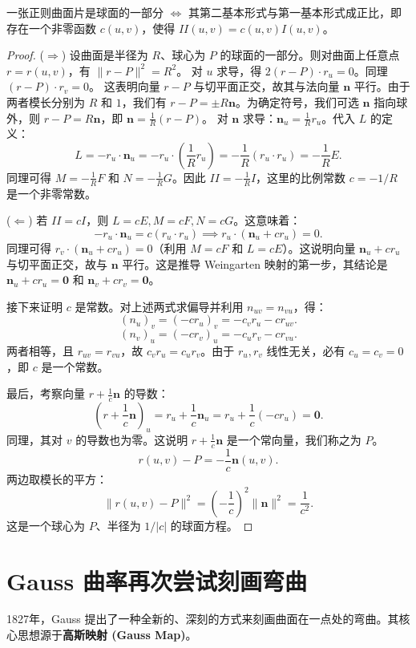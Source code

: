 \documentclass[lang=cn,10pt,thmcnt=section]{elegantbook}
\renewcommand{\vec}[1]{\mathbf{#1}}
\begin{document}
\begin{proposition}
    一张正则曲面片是球面的一部分 $\iff$ 其第二基本形式与第一基本形式成正比，即存在一个非零函数 $c(u,v)$，使得 $II(u,v) = c(u,v) I(u,v)$。
\end{proposition}
\begin{proof}
    ($\Rightarrow$) 设曲面是半径为 $R$、球心为 $P$ 的球面的一部分。则对曲面上任意点 $r=r(u,v)$，有 $\|r-P\|^2 = R^2$。
    对 $u$ 求导，得 $2(r-P) \cdot r_u = 0$。同理 $(r-P)\cdot r_v=0$。
    这表明向量 $r-P$ 与切平面正交，故其与法向量 $\vec{n}$ 平行。由于两者模长分别为 $R$ 和 $1$，我们有 $r-P = \pm R\vec{n}$。为确定符号，我们可选 $\vec{n}$ 指向球外，则 $r-P = R\vec{n}$，即 $\vec{n} = \frac{1}{R}(r-P)$。
    对 $\vec{n}$ 求导：$\vec{n}_u = \frac{1}{R}r_u$。代入 $L$ 的定义：
    \[
    L = -r_u \cdot \vec{n}_u = -r_u \cdot \left(\frac{1}{R}r_u\right) = -\frac{1}{R}(r_u \cdot r_u) = -\frac{1}{R}E.
    \]
    同理可得 $M = -\frac{1}{R}F$ 和 $N = -\frac{1}{R}G$。因此 $II = -\frac{1}{R}I$，这里的比例常数 $c = -1/R$ 是一个非零常数。
    
    ($\Leftarrow$) 若 $II = c I$，则 $L=cE, M=cF, N=cG$。这意味着：
    \[
    -r_u \cdot \vec{n}_u = c(r_u \cdot r_u) \implies r_u \cdot (\vec{n}_u + c r_u) = 0.
    \]
    同理可得 $r_v \cdot (\vec{n}_u + c r_u) = 0$（利用 $M=cF$ 和 $L=cE$）。这说明向量 $\vec{n}_u+cr_u$ 与切平面正交，故与 $\vec{n}$ 平行。这是推导 Weingarten 映射的第一步，其结论是 $\vec{n}_u + cr_u = \vec{0}$ 和 $\vec{n}_v + cr_v = \vec{0}$。
    
    接下来证明 $c$ 是常数。对上述两式求偏导并利用 $n_{uv}=n_{vu}$，得：
    \[
    (n_u)_v = (-cr_u)_v = -c_v r_u - c r_{uv}.
    \]
    \[
    (n_v)_u = (-cr_v)_u = -c_u r_v - c r_{vu}.
    \]
    两者相等，且 $r_{uv}=r_{vu}$，故 $c_v r_u = c_u r_v$。由于 $r_u, r_v$ 线性无关，必有 $c_u=c_v=0$，即 $c$ 是一个常数。
    
    最后，考察向量 $r + \frac{1}{c}\vec{n}$ 的导数：
    \[
    \left( r + \frac{1}{c}\vec{n} \right)_u = r_u + \frac{1}{c}\vec{n}_u = r_u + \frac{1}{c}(-cr_u) = \vec{0}.
    \]
    同理，其对 $v$ 的导数也为零。这说明 $r + \frac{1}{c}\vec{n}$ 是一个常向量，我们称之为 $P$。
    \[
    r(u,v) - P = -\frac{1}{c}\vec{n}(u,v).
    \]
    两边取模长的平方：
    \[
    \|r(u,v) - P\|^2 = \left(-\frac{1}{c}\right)^2 \|\vec{n}\|^2 = \frac{1}{c^2}.
    \]
    这是一个球心为 $P$、半径为 $1/|c|$ 的球面方程。
\end{proof}

\section{Gauss 曲率再次尝试刻画弯曲}
1827年，Gauss 提出了一种全新的、深刻的方式来刻画曲面在一点处的弯曲。其核心思想源于\textbf{高斯映射 (Gauss Map)}。
\end{document}
